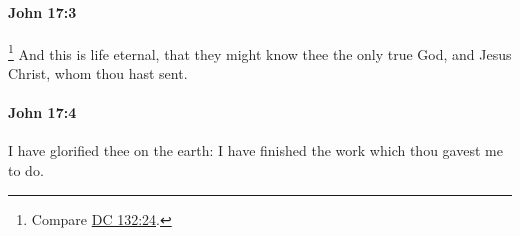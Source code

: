 		\paragraph{John 17:3} %
			\label{JOHN-17-3}

				\footnote{%
					Compare \hyperref[DC132-24]{DC 132:24}.
					}%
			And this is life eternal, that they might know thee the only true God, and Jesus Christ, whom thou hast sent.

			\begin{framed}
				\scriptsize
				\begin{compactdesc}
					\item[SBLG] 
				\end{compactdesc}
			\end{framed}

		\paragraph{John 17:4} %
			\label{JOHN-17-4}

			I have glorified thee on the earth: I have finished the work which thou gavest me to do.

